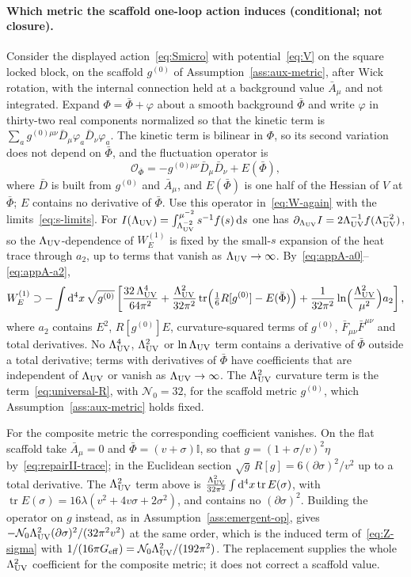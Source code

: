 \paragraph{Which metric the scaffold one-loop action induces (conditional; not closure).}
Consider the displayed action~\eqref{eq:Smicro} with
potential~\eqref{eq:V} on the square locked block, on the scaffold
\(g^{(0)}\) of Assumption~\ref{ass:aux-metric}, after Wick rotation,
with the internal connection held at a background value
\(\bar A_\mu\) and not integrated. Expand \(\Phi=\bar\Phi+\varphi\)
about a smooth background \(\bar\Phi\) and write \(\varphi\) in
thirty-two real components normalized so that the kinetic term is
\(\sum_a g^{(0)\mu\nu}\bar D_\mu\varphi_a\bar D_\nu\varphi_a\). The
kinetic term is bilinear in \(\Phi\), so its second variation does not
depend on \(\bar\Phi\), and the fluctuation operator is
\[
  \mathcal O_{\bar\Phi}
  =-g^{(0)\mu\nu}\bar D_\mu\bar D_\nu+E(\bar\Phi),
\]
where \(\bar D\) is built from \(g^{(0)}\) and \(\bar A_\mu\), and
\(E(\bar\Phi)\) is one half of the Hessian of \(V\) at \(\bar\Phi\);
\(E\) contains no derivative of \(\bar\Phi\). Use this operator
in~\eqref{eq:W-again} with the limits~\eqref{eq:s-limits}. For
\(I(\Lambda_{\mathrm{UV}})=\int_{\Lambda_{\mathrm{UV}}^{-2}}^{\mu^{-2}}s^{-1}f(s)\,\mathrm{d}s\) one has
\(\partial_{\Lambda_{\mathrm{UV}}}I=2\Lambda_{\mathrm{UV}}^{-1}f(\Lambda_{\mathrm{UV}}^{-2})\), so the
\(\Lambda_{\mathrm{UV}}\)-dependence of \(W_E^{(1)}\) is fixed by the small-\(s\)
expansion of the heat trace through \(a_2\), up to terms that vanish as
\(\Lambda_{\mathrm{UV}}\to\infty\). By~\eqref{eq:appA-a0}--\eqref{eq:appA-a2},
\[
  W_E^{(1)}\supset
  -\int\mathrm{d}^4x\,\sqrt{g^{(0)}}\left[
    \frac{32\,\Lambda_{\mathrm{UV}}^4}{64\pi^2}
    +\frac{\Lambda_{\mathrm{UV}}^2}{32\pi^2}
     \operatorname{tr}\Bigl(\tfrac16R[g^{(0)}]-E(\bar\Phi)\Bigr)
    +\frac{1}{32\pi^2}\ln\Bigl(\frac{\Lambda_{\mathrm{UV}}^2}{\mu^2}\Bigr)a_2
  \right],
\]
where \(a_2\) contains \(E^2\), \(R[g^{(0)}]E\), curvature-squared
terms of \(g^{(0)}\), \(\bar F_{\mu\nu}\bar F^{\mu\nu}\) and total
derivatives. No \(\Lambda_{\mathrm{UV}}^4\), \(\Lambda_{\mathrm{UV}}^2\) or \(\ln\Lambda_{\mathrm{UV}}\) term contains a derivative of
\(\bar\Phi\) outside a total derivative; terms with derivatives of
\(\bar\Phi\) have coefficients that are independent of \(\Lambda_{\mathrm{UV}}\) or vanish
as \(\Lambda_{\mathrm{UV}}\to\infty\). The \(\Lambda_{\mathrm{UV}}^2\) curvature term
is the term~\eqref{eq:universal-R}, with \(\mathcal N_0=32\), for the
scaffold metric \(g^{(0)}\), which Assumption~\ref{ass:aux-metric}
holds fixed.

For the composite metric the corresponding coefficient vanishes. On
the flat scaffold take \(\bar A_\mu=0\) and
\(\bar\Phi=(v+\sigma)\mathbb I\), so that
\(g=(1+\sigma/v)^2\eta\) by~\eqref{eq:repairII-trace}; in the
Euclidean section \(\sqrt g\,R[g]=6(\partial\sigma)^2/v^2\) up to a
total derivative. The \(\Lambda_{\mathrm{UV}}^2\) term above is
\(\tfrac{\Lambda_{\mathrm{UV}}^2}{32\pi^2}\int\mathrm{d}^4x\operatorname{tr}E(\sigma)\),
with \(\operatorname{tr}E(\sigma)=16\lambda(v^2+4v\sigma+2\sigma^2)\),
and contains no \((\partial\sigma)^2\). Building the operator on \(g\)
instead, as in Assumption~\ref{ass:emergent-op}, gives
\(-\mathcal N_0\Lambda_{\mathrm{UV}}^2(\partial\sigma)^2/(32\pi^2v^2)\) at the same
order, which is the induced term of~\eqref{eq:Z-sigma} with
\(1/(16\pi G_{\mathrm{eff}})=\mathcal N_0\Lambda_{\mathrm{UV}}^2/(192\pi^2)\). The
replacement supplies the whole \(\Lambda_{\mathrm{UV}}^2\) coefficient for the composite
metric; it does not correct a scaffold value.

